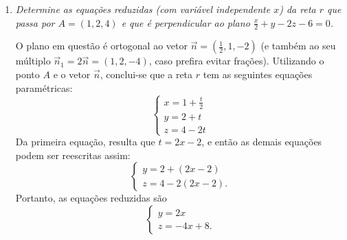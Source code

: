\documentclass[12pt,a4paper]{article}
\begin{document}
\begin{enumerate}
\item \textit{ Determine as equações reduzidas (com variável independente $x$) da reta $r$ que passa por $A = (1,2,4)$ e que é perpendicular ao plano $\frac{x}{2} + y - 2z - 6 = 0$. }

O plano em questão é ortogonal ao vetor $\vec{n} = (\frac{1}{2}, 1, -2)$ (e também ao seu múltiplo $\vec{n}_1 = 2 \vec{n} = (1, 2, -4)$, caso prefira evitar frações). Utilizando o ponto $A$ e o vetor $\vec{n}$, conclui-se que a reta $r$ tem as seguintes equações paramétricas:
\[
\begin{cases}
x = 1 + \frac{t}{2}\\
y = 2 + t\\
z = 4 - 2t
\end{cases}
\]
Da primeira equação, resulta que $t = 2x - 2$, e então as demais equações podem ser reescritas assim:
\[
\begin{cases}
y = 2 + (2x-2)\\
z = 4 - 2(2x-2).
\end{cases}
\]
Portanto, as equações reduzidas são
\[
\begin{cases}
y = 2x\\
z = -4x + 8.
\end{cases}
\]

\end{enumerate}
\end{document}
